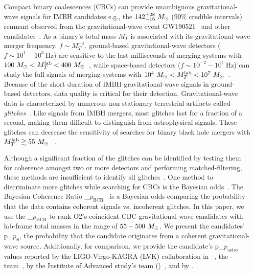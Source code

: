 \documentclass[
 nofootinbib,
 amsmath,amssymb,
 aps,
 twocolumn,
 superscriptaddress
]{revtex4-2}
\newcommand{\pycbc}{{\sc {{PyCBC}}}\xspace}
\newcommand{\GWTC}{{\sc {{GWTC-1}}}\xspace}
\newcommand{\IAS}{{\sc {{IAS}}}\xspace}
\newcommand{\fancytext}[1]{{\relax\ifmmode#1\else $#1$\fi}\xspace}
\newcommand{\mathcmd}[1]{{\sc \relax\ifmmode#1\else $#1$\fi}\xspace}
\newcommand{\bcr}{\mathcmd{\rho_\text{BCR}}}
\newcommand{\msun}{\mathcmd{M_\odot}}
\newcommand{\totMlab}{\mathcmd{M_T^{\rm{lab}}}}
\newcommand{\pastro}{\fancytext{p_\text{astro}}}
\newcommand{\pastrobcr}{\fancytext{p_\text{S}}}
\begin{document}
Compact binary coalescences (CBCs) can provide unambiguous gravitational-wave signals for IMBH candidates e.g., the ${142^{+28}_{-16}~\msun}$ ($90\%$ credible intervals) remnant observed from the gravitational-wave event GW190521~\cite{Abbott:2020:PhRvL} and other candidates~\cite{ligo_imbh_search, ligo_imbh_o3, pycbc_imbh}. As a binary's total mass $M_{T}$ is associated with its gravitational-wave merger frequency, ${f\sim M_{T}^{-1}}$,  ground-based gravitational-wave detectors (${f\sim 10^1 - 10^3\ \text{Hz}}$) are sensitive to the last milliseconds of merging systems with ${100~\msun < \totMlab < 400~\msun}$~\cite{LIGOScientificCollaboration:2015:CQGra, Martynov:2016:PhRvD, Moore_2014, Acernese:2015:CQGra}, while space-based detectors (${f\sim 10^{-2}-10^1\ \text{Hz}}$) can study the full signals of merging systems with ${10^4~\msun < \totMlab < 10^7~\msun}$~\cite{ Moore_2014, Lu:2019:PhRvD}. Because of the short duration of IMBH gravitational-wave signals in ground-based detectors, data quality is critical for their detection. Gravitational-wave data is characterized by numerous non-stationary terrestrial artifacts called \textit{glitches}~\cite{ pycbc_short_duration_transients, pe_with_glitch, blip_glitches}. Like signals from IMBH mergers, most glitches last for a fraction of a second, making them difficult to distinguish from astrophysical signals. These glitches can decrease the sensitivity of searches for binary black hole mergers with ${\totMlab\gtrsim55~\msun}$ ~\cite{pycbc_short_duration_transients}.

Although a significant fraction of the glitches can be identified by testing them for coherence amongst two or more detectors and performing matched-filtering, these methods are insufficient to identify all glitches~\cite{ pycbc_short_duration_transients, pe_with_glitch, blip_glitches}. One method to discriminate more glitches while searching for CBCs is the Bayesian odds~\cite{bci, kanner2016leveraging, BCR1, BCR2, bcr_gw151216, bayesian_odds}. The Bayesian Coherence Ratio \bcr~\cite{BCR1,BCR2} is a Bayesian odds comparing the probability that the data contains coherent signals vs. incoherent glitches. In this paper, we use the \bcr to rank O2’s coincident CBC gravitational-wave candidates with lab-frame total masses in the range of ${55-500~\msun}$. We present the candidates' \pastrobcr, the probability that the candidate originates from a coherent gravitational-wave source. Additionally, for comparison, we provide the candidate's \pastro values reported by the LIGO-Virgo-KAGRA (LVK) collaboration in \GWTC~\cite{GWTC1}, the \pycbc-team~\cite{pycbc_code, pycbc_og0, pycbc_og1, pycbc_og2, pycbc_og3, pycbc_og4, pycbc_og5, pycbc_og6, pycbc_single_det, pycbc_ogc_2}, by the Institute of Advanced study's team (\IAS)~\cite{IAS0, IAS1, IAS2}, and by \citet{bayesian_odds}. 
\end{document}
